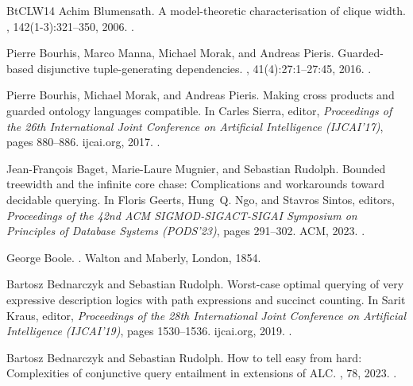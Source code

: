 \documentclass[10pt,a4paper]{amsart}
\theoremstyle{definition}
\numberwithin{equation}{section}
\theoremstyle{plain}
\theoremstyle{definition}
\theoremstyle{myexample}
\theoremstyle{plain}
\theoremstyle{definition}
\begin{document}
\begin{thebibliography}{BtCLW14}
Achim Blumensath.
\newblock A model-theoretic characterisation of clique width.
, 142(1-3):321--350, 2006.
\newblock \href {https://doi.org/10.1016/j.apal.2006.02.004}
  {}.

Pierre Bourhis, Marco Manna, Michael Morak, and Andreas Pieris.
\newblock Guarded-based disjunctive tuple-generating dependencies.
, 41(4):27:1--27:45,
  2016.
\newblock \href {https://doi.org/10.1145/2976736} {}.

Pierre Bourhis, Michael Morak, and Andreas Pieris.
\newblock Making cross products and guarded ontology languages compatible.
\newblock In Carles Sierra, editor, {\em Proceedings of the 26th International
  Joint Conference on Artificial Intelligence (IJCAI'17)}, pages 880--886.
  ijcai.org, 2017.
\newblock \href {https://doi.org/10.24963/ijcai.2017/122}
  {}.

Jean{-}Fran{\c{c}}ois Baget, Marie{-}Laure Mugnier, and Sebastian Rudolph.
\newblock Bounded treewidth and the infinite core chase: Complications and
  workarounds toward decidable querying.
\newblock In Floris Geerts, Hung~Q. Ngo, and Stavros Sintos, editors, {\em
  Proceedings of the 42nd {ACM} {SIGMOD-SIGACT-SIGAI} Symposium on Principles
  of Database Systems {(PODS'23)}}, pages 291--302. {ACM}, 2023.
\newblock \href {https://doi.org/10.1145/3584372.3588659}
  {}.

George Boole.
.
\newblock Walton and Maberly, London, 1854.

Bartosz Bednarczyk and Sebastian Rudolph.
\newblock Worst-case optimal querying of very expressive description logics
  with path expressions and succinct counting.
\newblock In Sarit Kraus, editor, {\em Proceedings of the 28th International
  Joint Conference on Artificial Intelligence ({IJCAI}'19)}, pages 1530--1536.
  ijcai.org, 2019.
\newblock \href {https://doi.org/10.24963/ijcai.2019/212}
  {}.

Bartosz Bednarczyk and Sebastian Rudolph.
\newblock How to tell easy from hard: Complexities of conjunctive query
  entailment in extensions of {ALC}.
, 78, 2023.
\newblock \href {https://doi.org/10.1613/JAIR.1.14482}
  {}.


\end{thebibliography}
\end{document}
